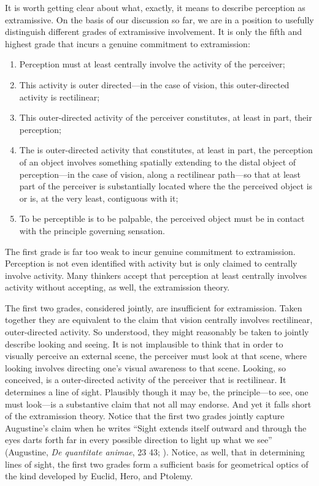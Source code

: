 \documentclass[12pt]{article}
\begin{document}
It is worth getting clear about what, exactly, it means to describe perception as extramissive. On the basis of our discussion so far, we are in a position to usefully distinguish different grades of extramissive involvement. It is only the fifth and highest grade that incurs a genuine commitment to extramission:
\begin{enumerate}[(1)]
	\item Perception must at least centrally involve the activity of the perceiver;
	\item This activity is outer directed---in the case of vision, this outer-directed activity is rectilinear;
	\item This outer-directed activity of the perceiver constitutes, at least in part, their perception;
	\item The is outer-directed activity that constitutes, at least in part, the perception of an object involves something spatially extending to the distal object of perception---in the case of vision, along a rectilinear path---so that at least part of the perceiver is substantially located where the the perceived object is or is, at the very least, contiguous with it;
	\item To be perceptible is to be palpable, the perceived object must be in contact with the principle governing sensation.
\end{enumerate}

The first grade is far too weak to incur genuine commitment to extramission. Perception is not even identified with activity but is only claimed to centrally involve activity. Many thinkers accept that perception at least centrally involves activity without accepting, as well, the extramission theory. 

The first two grades, considered jointly, are insufficient for extramission. Taken together they are equivalent to the claim that vision centrally involves rectilinear, outer-directed activity. So understood, they might reasonably be taken to jointly describe looking and seeing. It is not implausible to think that in order to visually perceive an external scene, the perceiver must look at that scene, where looking involves directing one's visual awareness to that scene. Looking, so conceived, is a outer-directed activity of the perceiver that is rectilinear. It determines a line of sight. Plausibly though it may be, the principle---to see, one must look---is a substantive claim that not all may endorse. And yet it falls short of the extramission theory. Notice that the first two grades jointly capture Augustine's claim when he writes ``Sight extends itself outward and through the eyes darts forth far in every possible direction to light up what we see'' (Augustine, \emph{De quantitate animae}, 23 43; \citealt[66]{Colleran:1949ys}). Notice, as well, that in determining lines of sight, the first two grades form a sufficient basis for geometrical optics of the kind developed by Euclid, Hero, and Ptolemy. 
\end{document}
